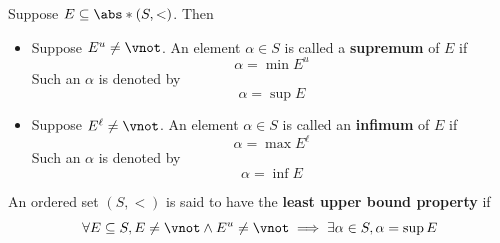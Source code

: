 \begin{definition} \label{an1:def:supremum-infimum}
  Suppose $E \subseteq \abs*{(S, <)}$. Then
  \begin{itemize}
    \item Suppose $E^{u} \neq \vnot$. An element $\alpha \in S$ is called a \textbf{supremum} of $E$ if
          \[
            \alpha = \min E^{u}
          \]
          Such an $\alpha$ is denoted by
          \[
            \alpha = \sup E
          \]
    \item Suppose $E^{\ell} \neq \vnot$. An element $\alpha \in S$ is called an \textbf{infimum} of $E$ if
          \[
            \alpha = \max E^{\ell}
          \]
          Such an $\alpha$ is denoted by
          \[
            \alpha = \inf E
          \]
  \end{itemize}
\end{definition}

\begin{definition} \label{an1:def:least-upper-bound-property}
  An ordered set $(S, <)$ is said to have the \textbf{least upper bound property} if
  \[
    \forall E \subseteq S, E \neq \vnot \land E^{u} \neq \vnot \implies \exists \alpha \in S, \alpha = \sup E
  \]
\end{definition}


